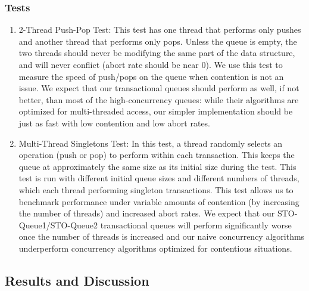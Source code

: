 \subsubsection{Tests}
\begin{enumerate}
\item 2-Thread Push-Pop Test: This test has one thread that performs only pushes and another thread that performs only pops. Unless the queue is empty, the two threads should never be modifying the same part of the data structure, and will never conflict (abort rate should be near 0). We use this test to measure the speed of push/pops on the queue when contention is not an issue. We expect that our transactional queues should perform as well, if not better, than most of the high-concurrency queues: while their algorithms are optimized for multi-threaded access, our simpler implementation should be just as fast with low contention and low abort rates.

\item Multi-Thread Singletons Test: 
    In this test, a thread randomly selects an operation (push or pop) to perform within each transaction. This keeps the queue at approximately the same size as its initial size during the test. This test is run with different initial queue sizes and different numbers of threads, which each thread performing singleton transactions. This test allows us to benchmark performance under variable amounts of contention (by increasing the number of threads) and increased abort rates. We expect that our STO-Queue1/STO-Queue2 transactional queues will perform significantly worse once the number of threads is increased and our naive concurrency algorithms underperform concurrency algorithms optimized for contentious situations.
    
    
\end{enumerate}

\subsection{Results and Discussion}

